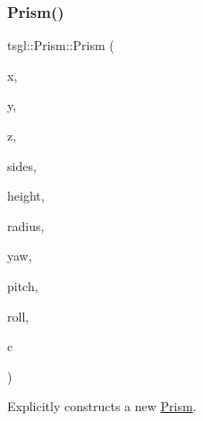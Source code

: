 \subsubsection{\texorpdfstring{Prism()}{Prism()}\hspace{0.1cm}{\footnotesize\ttfamily [1/2]}}
{\footnotesize\ttfamily tsgl\+::\+Prism\+::\+Prism (\begin{DoxyParamCaption}\item[{float}]{x,  }\item[{float}]{y,  }\item[{float}]{z,  }\item[{int}]{sides,  }\item[{G\+Lfloat}]{height,  }\item[{G\+Lfloat}]{radius,  }\item[{float}]{yaw,  }\item[{float}]{pitch,  }\item[{float}]{roll,  }\item[{\hyperlink{structtsgl_1_1_color_float}{Color\+Float}}]{c }\end{DoxyParamCaption})}



Explicitly constructs a new \hyperlink{classtsgl_1_1_prism}{Prism}. 

